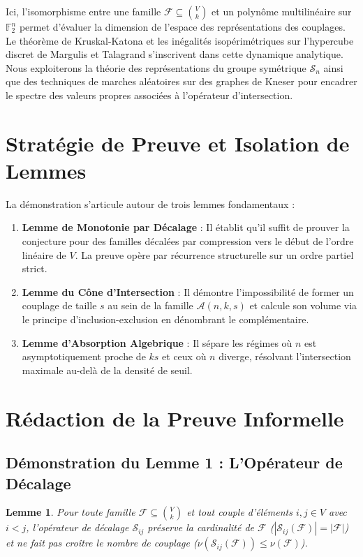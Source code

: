 \documentclass[12pt]{article}
\newtheorem{lemma}{Lemme}
\begin{document}
Ici, l'isomorphisme entre une famille $\mathcal{F} \subseteq \binom{V}{k}$ et un polyn\^ome multilin\'eaire sur $\mathbb{F}_2^n$ permet d'\'evaluer la dimension de l'espace des repr\'esentations des couplages. Le th\'eor\`eme de Kruskal-Katona et les in\'egalit\'es isop\'erim\'etriques sur l'hypercube discret de Margulis et Talagrand s'inscrivent dans cette dynamique analytique. Nous exploiterons la th\'eorie des repr\'esentations du groupe sym\'etrique $\mathcal{S}_n$ ainsi que des techniques de marches al\'eatoires sur des graphes de Kneser pour encadrer le spectre des valeurs propres associ\'ees \`a l'op\'erateur d'intersection.

\newpage
\section{Strat\'egie de Preuve et Isolation de Lemmes}

La d\'emonstration s'articule autour de trois lemmes fondamentaux :
\begin{enumerate}
    \item \textbf{Lemme de Monotonie par D\'ecalage} : Il \'etablit qu'il suffit de prouver la conjecture pour des familles d\'ecal\'ees par compression vers le d\'ebut de l'ordre lin\'eaire de $V$. La preuve op\`ere par r\'ecurrence structurelle sur un ordre partiel strict.
    \item \textbf{Lemme du C\^one d'Intersection} : Il d\'emontre l'impossibilit\'e de former un couplage de taille $s$ au sein de la famille $\mathcal{A}(n, k, s)$ et calcule son volume via le principe d'inclusion-exclusion en d\'enombrant le compl\'ementaire.
    \item \textbf{Lemme d'Absorption Algebrique} : Il s\'epare les r\'egimes o\`u $n$ est asymptotiquement proche de $ks$ et ceux o\`u $n$ diverge, r\'esolvant l'intersection maximale au-del\`a de la densit\'e de seuil.
\end{enumerate}

\newpage
\section{R\'edaction de la Preuve Informelle}

\subsection{D\'emonstration du Lemme 1 : L'Op\'erateur de D\'ecalage}

\begin{lemma}
Pour toute famille $\mathcal{F} \subseteq \binom{V}{k}$ et tout couple d'\'el\'ements $i, j \in V$ avec $i < j$, l'op\'erateur de d\'ecalage $\mathcal{S}_{ij}$ pr\'eserve la cardinalit\'e de $\mathcal{F}$ ($|\mathcal{S}_{ij}(\mathcal{F})| = |\mathcal{F}|$) et ne fait pas cro\^itre le nombre de couplage ($\nu(\mathcal{S}_{ij}(\mathcal{F})) \le \nu(\mathcal{F})$).
\end{lemma}
\end{document}

